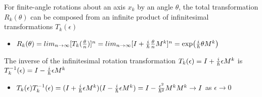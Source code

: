 \documentclass[8pt,t,mathserif,aspectratio=169]{beamer}
\begin{document}
\begin{frame}
\begin{itemize}
  \end{itemize}
  For finite-angle rotations about an axis $x_k$ by an angle $\theta$, the total transformation $R_k(\theta)$ can be composed from an infinite product of infinitesimal transformations $T_k(\epsilon)$
  \begin{itemize}
    \item $R_k(\theta) = lim_{n \to \infty} [T_{k}({\theta \over n})]^n = lim_{n \to \infty} [I + {i \over \hbar} {\theta \over n} M^k]^n = \exp({i \over \hbar} \theta M^{k})$
  \end{itemize}
  The inverse of the infinitesimal rotation transformation $T_k(\epsilon) = I + {i \over \hbar} \epsilon M^k$ is $T^{-1}_k(\epsilon) = I - {i \over \hbar} \epsilon M^k$
  \begin{itemize}
    \item $T_k(\epsilon) T^{-1}_k(\epsilon) = (I + {i \over \hbar} \epsilon M^k)(I - {i \over \hbar} \epsilon M^k) = I - {\epsilon^{2} \over \hbar^2} M^k M^k \to I$ as $\epsilon \to 0$
  \end{itemize}
\end{frame}
\end{document}
